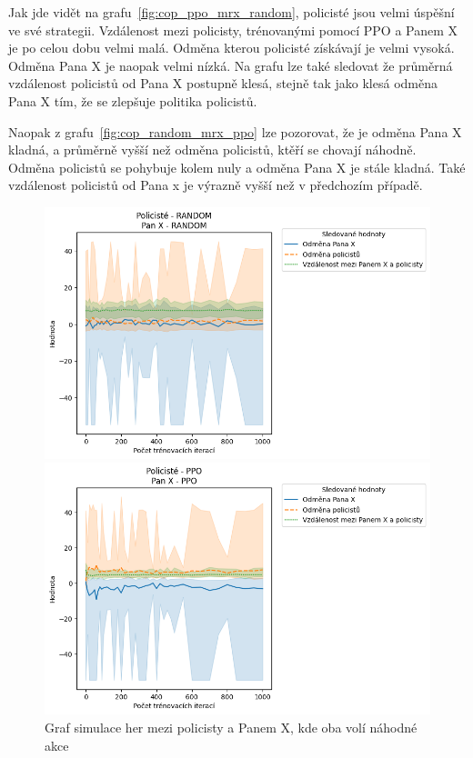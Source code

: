 Jak jde vidět na grafu~\ref{fig:cop_ppo_mrx_random}, policisté jsou velmi úspěšní ve své strategii.
Vzdálenost mezi policisty, trénovanými pomocí PPO a Panem X je po celou dobu velmi malá.
Odměna kterou policisté získávají je velmi vysoká.
Odměna Pana X je naopak velmi nízká.
Na grafu lze také sledovat že průměrná vzdálenost policistů od Pana X postupně klesá, stejně tak jako klesá odměna Pana X tím, že se zlepšuje politika policistů.

Naopak z grafu~\ref{fig:cop_random_mrx_ppo} lze pozorovat, že je odměna Pana X kladná, a průměrně vyšší než odměna policistů, ktěří se chovají náhodně.
Odměna policistů se pohybuje kolem nuly a odměna Pana X je stále kladná.
Také vzdálenost policistů od Pana x je výrazně vyšší než v předchozím případě.

\begin{figure}[H]
  \centering
  \begin{minipage}{.45\textwidth}
    \centering
    \includegraphics[width=1\textwidth]{obrazky-figures/graphs/cop_RANDOM_mrx_RANDOM.png}
    \caption{Graf simulace her mezi policisty a Panem X, kde oba volí náhodné akce}
    \label{fig:cop_random_mrx_random}
  \end{minipage}\hfill
  \begin{minipage}{.45\textwidth}
    \centering
    \includegraphics[width=1\textwidth]{obrazky-figures/graphs/cop_PPO_mrx_PPO.png}

\end{minipage}
\end{figure}
